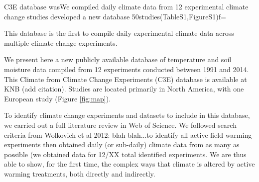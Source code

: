 \documentclass{article}
\begin{document}
C3E database wasWe compiled daily climate data from 12 experimental climate change studies developed a new database 50studies(TableS1,FigureS1)f=

This database is the first to compile daily experimental climate data across multiple climate change experiments.

\par We present here a new publicly  available database of temperature and soil moisture data compiled from 12 experiments conducted between 1991 and 2014. This Climate from Climate Change Experiments (C3E) database is available at KNB (add citation). Studies are located primarily in North America, with one European study (Figure \ref{fig:map}).

\par To identify climate change experiments and datasets to include in this database, we carried out a full literature review in Web of Science. We followed search criteria from Wolkovich et al 2012: blah blah...to identify all active field warming experiments then obtained daily (or sub-daily) climate data from as many as possible (we obtained data for 12/XX total identified experiments. We are thus able to show, for the first time, the complex ways that climate is altered by active warming treatments, both directly and indirectly. 


\end{document}
